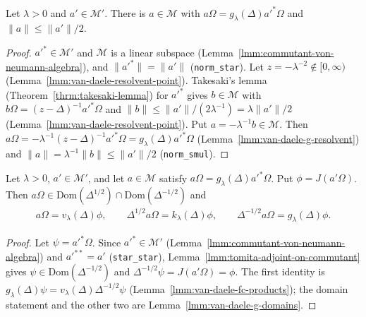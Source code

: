 \begin{lemma}
    \label{lmm:van-daele-element}
    \leanok
    Let $\lambda > 0$ and $a' \in \mathcal{M}'$. There is $a \in \mathcal{M}$ with $a\Omega = g_\lambda(\Delta)a'^*\Omega$ and $\|a\| \le \|a'\|/2$.
\end{lemma}
\begin{proof}
    \leanok
    $a'^* \in \mathcal{M}'$ and $\mathcal{M}$ is a linear subspace (Lemma~\ref{lmm:commutant-von-neumann-algebra}), and $\|a'^*\| = \|a'\|$ (\texttt{norm\_star}). Let $z = -\lambda^{-2} \notin [0, \infty)$ (Lemma~\ref{lmm:van-daele-resolvent-point}). Takesaki's lemma (Theorem~\ref{thrm:takesaki-lemma}) for $a'^*$ gives $b \in \mathcal{M}$ with $b\Omega = (z - \Delta)^{-1}a'^*\Omega$ and $\|b\| \le \|a'\|/(2\lambda^{-1}) = \lambda\|a'\|/2$ (Lemma~\ref{lmm:van-daele-resolvent-point}). Put $a = -\lambda^{-1}b \in \mathcal{M}$. Then $a\Omega = -\lambda^{-1}(z - \Delta)^{-1}a'^*\Omega = g_\lambda(\Delta)a'^*\Omega$ (Lemma~\ref{lmm:van-daele-g-resolvent}) and $\|a\| = \lambda^{-1}\|b\| \le \|a'\|/2$ (\texttt{norm\_smul}).
\end{proof}

\begin{lemma}
    \label{lmm:van-daele-element-formulas}
    \leanok
    Let $\lambda > 0$, $a' \in \mathcal{M}'$, and let $a \in \mathcal{M}$ satisfy $a\Omega = g_\lambda(\Delta)a'^*\Omega$. Put $\phi = J(a'\Omega)$. Then $a\Omega \in \text{Dom}(\Delta^{1/2}) \cap \text{Dom}(\Delta^{-1/2})$ and
    \begin{align}
        a\Omega = v_\lambda(\Delta)\phi, \qquad \Delta^{1/2}a\Omega = k_\lambda(\Delta)\phi, \qquad \Delta^{-1/2}a\Omega = g_\lambda(\Delta)\phi.
    \end{align}
\end{lemma}
\begin{proof}
    \leanok
    Let $\psi = a'^*\Omega$. Since $a'^* \in \mathcal{M}'$ (Lemma~\ref{lmm:commutant-von-neumann-algebra}) and $a'^{**} = a'$ (\texttt{star\_star}), Lemma~\ref{lmm:tomita-adjoint-on-commutant} gives $\psi \in \text{Dom}(\Delta^{-1/2})$ and $\Delta^{-1/2}\psi = J(a'\Omega) = \phi$. The first identity is $g_\lambda(\Delta)\psi = v_\lambda(\Delta)\Delta^{-1/2}\psi$ (Lemma~\ref{lmm:van-daele-fc-products}); the domain statement and the other two are Lemma~\ref{lmm:van-daele-g-domains}.
\end{proof}

